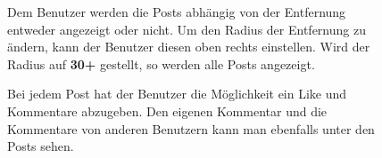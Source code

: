 \begin{figure}[H]
\begin{minipage}{.6\textwidth}
\begin{changemargin}{0.5cm}{0cm}
            Dem Benutzer werden die Posts abhängig von der Entfernung entweder angezeigt oder nicht. Um den Radius der Entfernung zu ändern, kann der Benutzer diesen oben rechts einstellen. Wird der Radius auf \glqq \textbf{30+}\grqq{} gestellt, so werden alle Posts angezeigt.

            Bei jedem Post hat der Benutzer die Möglichkeit ein Like und Kommentare abzugeben. Den eigenen Kommentar und die Kommentare von anderen Benutzern kann man ebenfalls unter den Posts sehen. 
        \end{changemargin}
    \end{minipage}
\end{figure}

